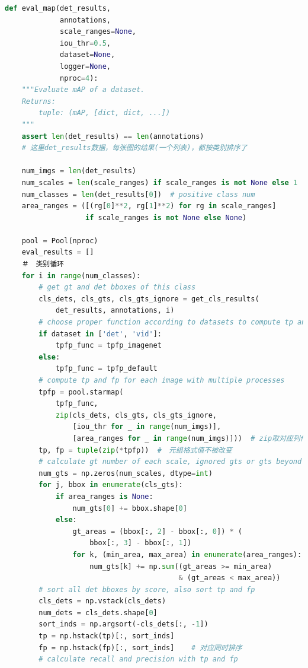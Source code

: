\documentclass[UTF8]{ctexart}
\begin{document}
\lstset{style=mystyle}
\begin{lstlisting}[language=Python]
def eval_map(det_results,
             annotations,
             scale_ranges=None,
             iou_thr=0.5,
             dataset=None,
             logger=None,
             nproc=4):
    """Evaluate mAP of a dataset.
    Returns:
        tuple: (mAP, [dict, dict, ...])
    """
    assert len(det_results) == len(annotations)
    # 这里det_results数据，每张图的结果(一个列表)，都按类别排序了

    num_imgs = len(det_results)
    num_scales = len(scale_ranges) if scale_ranges is not None else 1
    num_classes = len(det_results[0])  # positive class num
    area_ranges = ([(rg[0]**2, rg[1]**2) for rg in scale_ranges]
                   if scale_ranges is not None else None)

    pool = Pool(nproc)　
    eval_results = []
    ＃　类别循环
    for i in range(num_classes):
        # get gt and det bboxes of this class
        cls_dets, cls_gts, cls_gts_ignore = get_cls_results(
            det_results, annotations, i)
        # choose proper function according to datasets to compute tp and fp
        if dataset in ['det', 'vid']:
            tpfp_func = tpfp_imagenet
        else:
            tpfp_func = tpfp_default
        # compute tp and fp for each image with multiple processes
        tpfp = pool.starmap(
            tpfp_func,
            zip(cls_dets, cls_gts, cls_gts_ignore,
                [iou_thr for _ in range(num_imgs)],
                [area_ranges for _ in range(num_imgs)]))  # zip取对应列作为一套参数，进入多进程
        tp, fp = tuple(zip(*tpfp))  #　元组格式值不被改变
        # calculate gt number of each scale, ignored gts or gts beyond the specific scale are not counted
        num_gts = np.zeros(num_scales, dtype=int)
        for j, bbox in enumerate(cls_gts):
            if area_ranges is None:
                num_gts[0] += bbox.shape[0]
            else:
                gt_areas = (bbox[:, 2] - bbox[:, 0]) * (
                    bbox[:, 3] - bbox[:, 1])
                for k, (min_area, max_area) in enumerate(area_ranges):
                    num_gts[k] += np.sum((gt_areas >= min_area)
                                         & (gt_areas < max_area))
        # sort all det bboxes by score, also sort tp and fp
        cls_dets = np.vstack(cls_dets)
        num_dets = cls_dets.shape[0]
        sort_inds = np.argsort(-cls_dets[:, -1])
        tp = np.hstack(tp)[:, sort_inds]
        fp = np.hstack(fp)[:, sort_inds]    # 对应同时排序
        # calculate recall and precision with tp and fp

\end{lstlisting}
\end{document}
